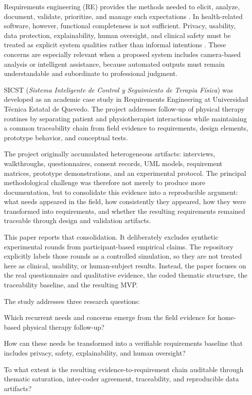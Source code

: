 \documentclass[10pt,a4paper]{article}
\begin{document}
Requirements engineering (RE) provides the methods needed to elicit, analyze, document, validate, prioritize, and manage such expectations \citep{pohl2010requirements,iso29148_2018,sommerville2016software}. In health-related software, however, functional completeness is not sufficient. Privacy, usability, data protection, explainability, human oversight, and clinical safety must be treated as explicit system qualities rather than informal intentions \citep{iso25010_2023,chung2009nfr,chazette2020explainability}. These concerns are especially relevant when a proposed system includes camera-based analysis or intelligent assistance, because automated outputs must remain understandable and subordinate to professional judgment.

SICST (\textit{Sistema Inteligente de Control y Seguimiento de Terapia Física}) was developed as an academic case study in Requirements Engineering at Universidad Técnica Estatal de Quevedo. The project addresses follow-up of physical therapy routines by separating patient and physiotherapist interactions while maintaining a common traceability chain from field evidence to requirements, design elements, prototype behavior, and conceptual tests.

The project originally accumulated heterogeneous artifacts: interviews, walkthroughs, questionnaires, consent records, UML models, requirement matrices, prototype demonstrations, and an experimental protocol. The principal methodological challenge was therefore not merely to produce more documentation, but to consolidate this evidence into a reproducible argument: what needs appeared in the field, how consistently they appeared, how they were transformed into requirements, and whether the resulting requirements remained traceable through design and validation artifacts.

This paper reports that consolidation. It deliberately excludes synthetic experimental rounds from participant-based empirical claims. The repository explicitly labels those rounds as a controlled simulation, so they are not treated here as clinical, usability, or human-subject results. Instead, the paper focuses on the real questionnaire and qualitative evidence, the coded thematic structure, the traceability baseline, and the resulting MVP.

The study addresses three research questions:

\begin{description}[leftmargin=1.3cm,labelwidth=1.0cm]
\item[RQ1.] Which recurrent needs and concerns emerge from the field evidence for home-based physical therapy follow-up?
\item[RQ2.] How can these needs be transformed into a verifiable requirements baseline that includes privacy, safety, explainability, and human oversight?
\item[RQ3.] To what extent is the resulting evidence-to-requirement chain auditable through thematic saturation, inter-coder agreement, traceability, and reproducible data artifacts?
\end{description}
\end{document}
